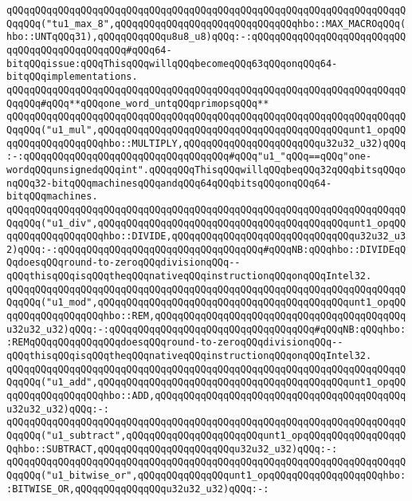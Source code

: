 \verb|qQQqqQQqqQQqqQQqqQQqqQQqqQQqqQQqqQQqqQQqqQQqqQQqqQQqqQQqqQQqqQQqqQQqqQQqqQQq("tu1_max_8",qQQqqQQqqQQqqQQqqQQqqQQqqQQqqQQqhbo::MAX_MACROqQQq(hbo::UNTqQQq31),qQQqqQQqqQQqu8u8_u8)qQQq:-:qQQqqQQqqQQqqQQqqQQqqQQqqQQqqQQqqQQqqQQqqQQqqQQq#qQQq64-bitqQQqissue:qQQqThisqQQqwillqQQqbecomeqQQq63qQQqonqQQq64-bitqQQqimplementations.|\newline
\newline
\verb|qQQqqQQqqQQqqQQqqQQqqQQqqQQqqQQqqQQqqQQqqQQqqQQqqQQqqQQqqQQqqQQqqQQqqQQqqQQq#qQQq**qQQqone_word_untqQQqprimopsqQQq**|\newline
\verb|qQQqqQQqqQQqqQQqqQQqqQQqqQQqqQQqqQQqqQQqqQQqqQQqqQQqqQQqqQQqqQQqqQQqqQQqqQQq("u1_mul",qQQqqQQqqQQqqQQqqQQqqQQqqQQqqQQqqQQqqQQqqQQqunt1_opqQQqqQQqqQQqqQQqqQQqhbo::MULTIPLY,qQQqqQQqqQQqqQQqqQQqqQQqu32u32_u32)qQQq:-:qQQqqQQqqQQqqQQqqQQqqQQqqQQqqQQqqQQq#qQQq"u1_"qQQq==qQQq"one-wordqQQqunsignedqQQqint".qQQqqQQqThisqQQqwillqQQqbeqQQq32qQQqbitsqQQqonqQQq32-bitqQQqmachinesqQQqandqQQq64qQQqbitsqQQqonqQQq64-bitqQQqmachines.|\newline
\verb|qQQqqQQqqQQqqQQqqQQqqQQqqQQqqQQqqQQqqQQqqQQqqQQqqQQqqQQqqQQqqQQqqQQqqQQqqQQq("u1_div",qQQqqQQqqQQqqQQqqQQqqQQqqQQqqQQqqQQqqQQqqQQqunt1_opqQQqqQQqqQQqqQQqqQQqhbo::DIVIDE,qQQqqQQqqQQqqQQqqQQqqQQqqQQqqQQqu32u32_u32)qQQq:-:qQQqqQQqqQQqqQQqqQQqqQQqqQQqqQQqqQQq#qQQqNB:qQQqhbo::DIVIDEqQQqdoesqQQqround-to-zeroqQQqdivisionqQQq--qQQqthisqQQqisqQQqtheqQQqnativeqQQqinstructionqQQqonqQQqIntel32.|\newline
\verb|qQQqqQQqqQQqqQQqqQQqqQQqqQQqqQQqqQQqqQQqqQQqqQQqqQQqqQQqqQQqqQQqqQQqqQQqqQQq("u1_mod",qQQqqQQqqQQqqQQqqQQqqQQqqQQqqQQqqQQqqQQqqQQqunt1_opqQQqqQQqqQQqqQQqqQQqhbo::REM,qQQqqQQqqQQqqQQqqQQqqQQqqQQqqQQqqQQqqQQqqQQqu32u32_u32)qQQq:-:qQQqqQQqqQQqqQQqqQQqqQQqqQQqqQQqqQQq#qQQqNB:qQQqhbo::REMqQQqqQQqqQQqqQQqdoesqQQqround-to-zeroqQQqdivisionqQQq--qQQqthisqQQqisqQQqtheqQQqnativeqQQqinstructionqQQqonqQQqIntel32.|\newline
\verb|qQQqqQQqqQQqqQQqqQQqqQQqqQQqqQQqqQQqqQQqqQQqqQQqqQQqqQQqqQQqqQQqqQQqqQQqqQQq("u1_add",qQQqqQQqqQQqqQQqqQQqqQQqqQQqqQQqqQQqqQQqqQQqunt1_opqQQqqQQqqQQqqQQqqQQqhbo::ADD,qQQqqQQqqQQqqQQqqQQqqQQqqQQqqQQqqQQqqQQqqQQqu32u32_u32)qQQq:-:|\newline
\verb|qQQqqQQqqQQqqQQqqQQqqQQqqQQqqQQqqQQqqQQqqQQqqQQqqQQqqQQqqQQqqQQqqQQqqQQqqQQq("u1_subtract",qQQqqQQqqQQqqQQqqQQqqQQqunt1_opqQQqqQQqqQQqqQQqqQQqhbo::SUBTRACT,qQQqqQQqqQQqqQQqqQQqqQQqu32u32_u32)qQQq:-:|\newline
\verb|qQQqqQQqqQQqqQQqqQQqqQQqqQQqqQQqqQQqqQQqqQQqqQQqqQQqqQQqqQQqqQQqqQQqqQQqqQQq("u1_bitwise_or",qQQqqQQqqQQqqQQqunt1_opqQQqqQQqqQQqqQQqqQQqhbo::BITWISE_OR,qQQqqQQqqQQqqQQqu32u32_u32)qQQq:-:|\newline
